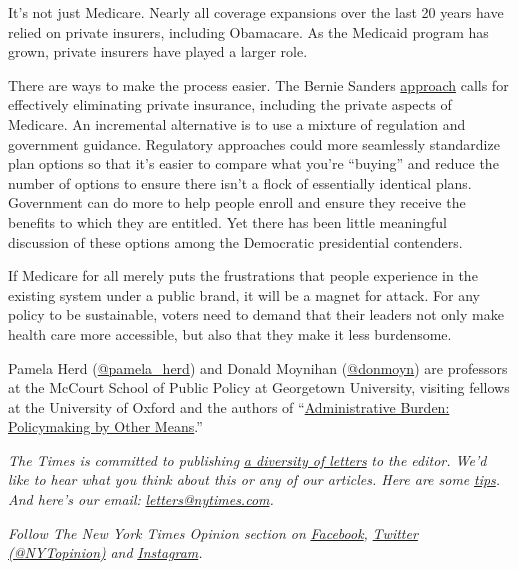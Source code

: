 It's not just Medicare. Nearly all coverage expansions over the last 20
years have relied on private insurers, including Obamacare. As the
Medicaid program has grown, private insurers have played a larger role.

There are ways to make the process easier. The Bernie Sanders
\href{https://www.nytimes.com/2019/03/23/health/private-health-insurance-medicare-for-all-bernie-sanders.html}{approach}
calls for effectively eliminating private insurance, including the
private aspects of Medicare. An incremental alternative is to use a
mixture of regulation and government guidance. Regulatory approaches
could more seamlessly standardize plan options so that it's easier to
compare what you're ``buying'' and reduce the number of options to
ensure there isn't a flock of essentially identical plans. Government
can do more to help people enroll and ensure they receive the benefits
to which they are entitled. Yet there has been little meaningful
discussion of these options among the Democratic presidential
contenders.

If Medicare for all merely puts the frustrations that people experience
in the existing system under a public brand, it will be a magnet for
attack. For any policy to be sustainable, voters need to demand that
their leaders not only make health care more accessible, but also that
they make it less burdensome.

Pamela Herd
(\href{https://twitter.com/pamela_herd?lang=en}{@pamela\_herd}) and
Donald Moynihan
(\href{https://twitter.com/donmoyn?ref_src=twsrc\%5Egoogle\%7Ctwcamp\%5Eserp\%7Ctwgr\%5Eauthor}{@donmoyn})
are professors at the McCourt School of Public Policy at Georgetown
University, visiting fellows at the University of Oxford and the authors
of
``\href{https://www.russellsage.org/publications/administrative-burden}{Administrative
Burden: Policymaking by Other Means}.''

\emph{The Times is committed to publishing}
\href{https://www.nytimes.com/2019/01/31/opinion/letters/letters-to-editor-new-york-times-women.html}{\emph{a
diversity of letters}} \emph{to the editor. We'd like to hear what you
think about this or any of our articles. Here are some}
\href{https://help.nytimes.com/hc/en-us/articles/115014925288-How-to-submit-a-letter-to-the-editor}{\emph{tips}}\emph{.
And here's our email:}
\href{mailto:letters@nytimes.com}{\emph{letters@nytimes.com}}\emph{.}

\emph{Follow The New York Times Opinion section on}
\href{https://www.facebook.com/nytopinion}{\emph{Facebook}}\emph{,}
\href{http://twitter.com/NYTOpinion}{\emph{Twitter (@NYTopinion)}}
\emph{and}
\href{https://www.instagram.com/nytopinion/}{\emph{Instagram}}\emph{.}

